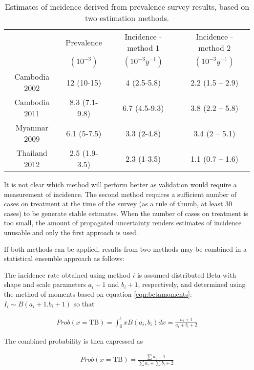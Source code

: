 \begin{table} 
\label{tab:2methods}
    \begin{tabular}{ c c c c }
    \hline
         & Prevalence & Incidence - method 1 & Incidence - method 2 \\ 
         & $(10^{-3})$  & $(10^{-3} y^{-1})$     & $(10^{-3} y^{-1})$ \\
    \hline
        Cambodia 2002 & 12 (10-15) & 4 (2.5-5.8) & 2.2 (1.5 – 2.9) \\ 
        Cambodia 2011 & 8.3 (7.1-9.8) & 6.7 (4.5-9.3) & 3.8 (2.2 – 5.8) \\ 
        Myanmar 2009 & 6.1 (5-7.5) & 3.3 (2-4.8) & 3.4 (2 – 5.1) \\ 
        Thailand 2012 & 2.5 (1.9-3.5) & 2.3 (1-3.5) & 1.1 (0.7 – 1.6) \\ 
    \hline
    \end{tabular} 
    \caption{Estimates of incidence derived from prevalence survey results, based on two estimation methods.} 
\end{table}

It is not clear which method will perform better as validation would require a measurement of incidence. The second method requires a sufficient number of cases on treatment at the time of the survey (as a rule of thumb, at least 30 cases) to be generate stable estimates. When the number of cases on treatment is too small, the amount of propagated uncertainty renders estimates of incidence unusable and only the first approach is used. 

If both methods can be applied, results from two methods may be combined in a statistical ensemble approach as follows:

The incidence rate obtained using method $i$ is assumed distributed Beta with shape and scale parameters $a_i + 1$ and $b_i + 1$, respectively, and determined using the method of moments based on equation \ref{eqn:betamoments}: $I_i \sim B(a_i + 1. b_i + 1)$ so that 

\begin{align*}
Prob(x = \textrm{TB})= \int_{0}^{1} x B(a_i,b_i) dx = \frac{a_i+1}{a_i+b_i+2}
\end{align*}

The combined probability is then expressed as 

\begin{align*}
Prob(x = \textrm{TB}) = \frac{\sum{a_i}+1}{\sum{a_i}+\sum{b_i}+2} 
\end{align*}




